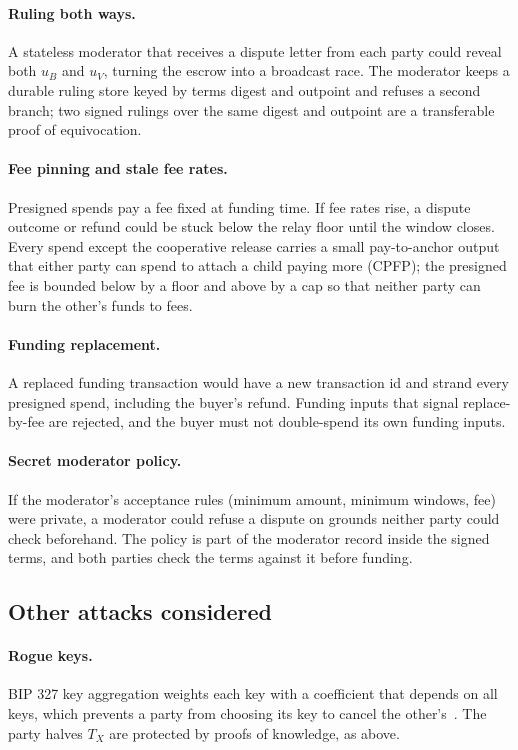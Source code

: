 \paragraph{Ruling both ways.} A stateless moderator that receives a dispute letter from each party could reveal both $u_B$ and $u_V$, turning the escrow into a broadcast race. The moderator keeps a durable ruling store keyed by terms digest and outpoint and refuses a second branch; two signed rulings over the same digest and outpoint are a transferable proof of equivocation.

\paragraph{Fee pinning and stale fee rates.} Presigned spends pay a fee fixed at funding time. If fee rates rise, a dispute outcome or refund could be stuck below the relay floor until the window closes. Every spend except the cooperative release carries a small pay-to-anchor output that either party can spend to attach a child paying more (CPFP); the presigned fee is bounded below by a floor and above by a cap so that neither party can burn the other's funds to fees.

\paragraph{Funding replacement.} A replaced funding transaction would have a new transaction id and strand every presigned spend, including the buyer's refund. Funding inputs that signal replace-by-fee are rejected, and the buyer must not double-spend its own funding inputs.

\paragraph{Secret moderator policy.} If the moderator's acceptance rules (minimum amount, minimum windows, fee) were private, a moderator could refuse a dispute on grounds neither party could check beforehand. The policy is part of the moderator record inside the signed terms, and both parties check the terms against it before funding.

\subsection{Other attacks considered}

\paragraph{Rogue keys.} BIP 327 key aggregation weights each key with a coefficient that depends on all keys, which prevents a party from choosing its key to cancel the other's~\citep{maxwell2019musig}. The party halves $T_X$ are protected by proofs of knowledge, as above.

